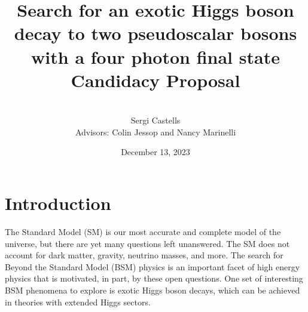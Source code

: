 \documentclass[12pt]{article}
\title{
    Search for an exotic Higgs boson decay to two pseudoscalar bosons with a four photon final state\\[0.2cm]
    \Large Candidacy Proposal
}
\author{\\[0.15cm]Sergi Castells\\[0.25cm] Advisors: Colin Jessop and Nancy Marinelli\\[0.65cm]}
\date{December 13, 2023}
\begin{document}
\maketitle


\section{Introduction}
The Standard Model (SM) is our most accurate and complete model of the universe, but there are yet many questions left unanswered. The SM does not account for dark matter, gravity, neutrino masses, and more. The search for Beyond the Standard Model (BSM) physics is an important facet of high energy physics that is motivated, in part, by these open questions. One set of interesting BSM phenomena to explore is exotic Higgs boson decays, which can be achieved in theories with extended Higgs sectors.\par


\end{document}
